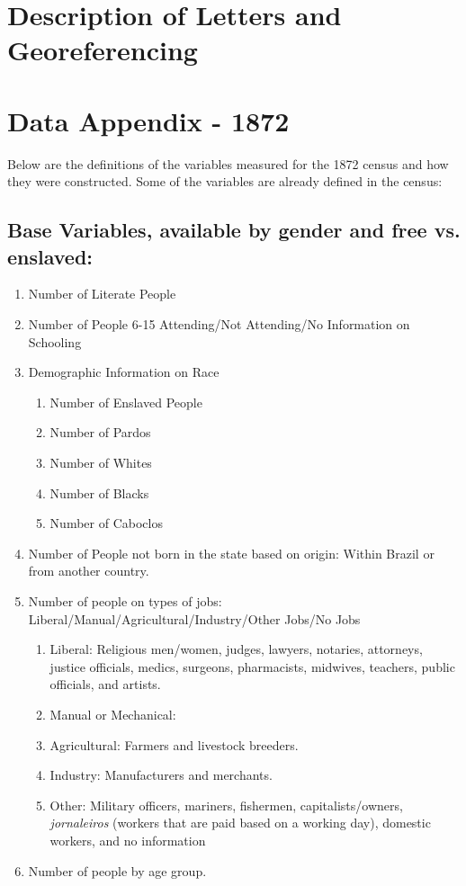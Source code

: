 \documentclass{article}
\begin{document}
\clearpage

\section{Description of Letters and Georeferencing}
\label{app:appendix_data}
\clearpage

\section{Data Appendix - 1872}
\label{app:variable_construction_1872}

Below are the definitions of the variables measured for the 1872 census and how they were constructed. Some of the variables are already defined in the census:

\subsection{Base Variables, available by gender and free vs. enslaved:}

\begin{enumerate}
  \item Number of Literate People
  \item Number of People 6-15 Attending/Not Attending/No Information on Schooling
  \item Demographic Information on Race
    \begin{enumerate}
      \item Number of Enslaved People
      \item Number of Pardos
      \item Number of Whites
      \item Number of Blacks
      \item Number of Caboclos
    \end{enumerate}
  \item Number of People not born in the state based on origin: Within Brazil or from another country.
  \item Number of people on types of jobs: Liberal/Manual/Agricultural/Industry/Other Jobs/No Jobs
    \begin{enumerate}
      \item Liberal: Religious men/women, judges, lawyers, notaries, attorneys, justice officials, medics, surgeons, pharmacists, midwives, teachers, public officials, and artists.
      \item Manual or Mechanical: 
      \item Agricultural: Farmers and livestock breeders.
      \item Industry: Manufacturers and merchants.
      \item Other: Military officers, mariners, fishermen, capitalists/owners, \textit{jornaleiros} (workers that are paid based on a working day), domestic workers, and no information
    \end{enumerate}
  \item Number of people by age group.
\end{enumerate}
\end{document}
